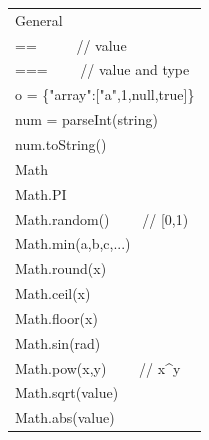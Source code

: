 \documentclass{article}
\begin{document}
\ttfamily

\begin{minipage}{0.9\textwidth}
\small
\begin{multicols}{3}

\begin{tabular}{l}
\color{javascriptyellow} {\sffamily General}   \\
== \ \ \ \ \ // value                          \\
=== \ \ \ \ // value and type                  \\
o = \{"array":["a",1,null,true]\}              \\
num = parseInt(string)                         \\
num.toString()                                 \\
\color{javascriptyellow} {\sffamily Math}      \\
Math.PI                                        \\
Math.random() \ \ \ \ // [0,1)                 \\
Math.min(a,b,c,...)                            \\
Math.round(x)                                  \\
Math.ceil(x)                                   \\
Math.floor(x)                                  \\
Math.sin(rad)                                  \\
Math.pow(x,y) \ \ \ \ // x\^{}y                \\
Math.sqrt(value)                               \\
Math.abs(value)
\end{tabular}


\end{multicols}
\end{minipage}
\end{document}
